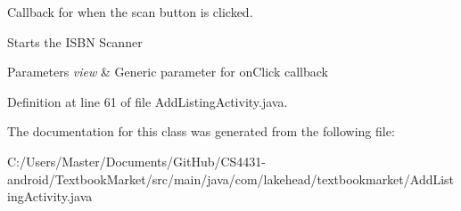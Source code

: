 Callback for when the scan button is clicked. 

Starts the I\-S\-B\-N Scanner 
\begin{DoxyParams}{Parameters}
{\em view} & Generic parameter for on\-Click callback \\
\hline
\end{DoxyParams}


Definition at line 61 of file Add\-Listing\-Activity.\-java.



The documentation for this class was generated from the following file\-:\begin{DoxyCompactItemize}
\item 
C\-:/\-Users/\-Master/\-Documents/\-Git\-Hub/\-C\-S4431-\/android/\-Textbook\-Market/src/main/java/com/lakehead/textbookmarket/Add\-Listing\-Activity.\-java\end{DoxyCompactItemize}
